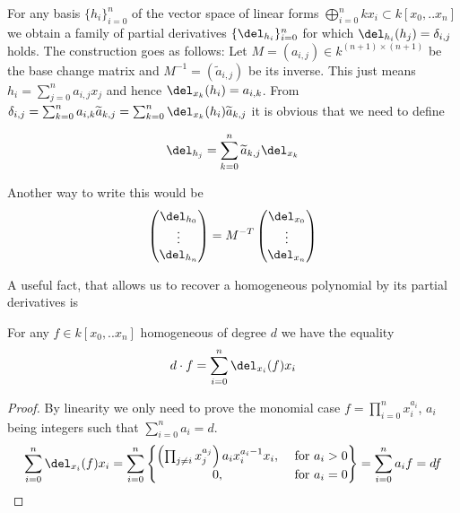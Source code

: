 \begin{example} \label{exampleAlternativePartialDerivatives}
For any basis $\{ h_i\}_{i=0}^n$ of the vector space of linear forms $\bigoplus_{i=0}^n kx_i \subset k[x_0,..x_n]$ we obtain a family of partial derivatives $\{ \del_{h_i} \}_{i=0}^n$ for which $\del_{h_i}(h_j) = \delta_{i,j}$ holds. The construction goes as follows: Let $M = (a_{i,j})  \in k^{(n+1)\times(n+1)}$ be the base change matrix and $M^{-1} = (\widetilde a_{i,j})$ be its inverse.
This just means $h_i = \sum_{j=0}^n a_{i,j} x_j$ and hence $\del_{x_k}(h_i) = a_{i,k}$.
From $\delta_{i,j} = \sum_{k=0}^n a_{i,k}\widetilde a_{k,j}
= \sum_{k=0}^n \del_{x_k}(h_i) \widetilde a_{k,j}$ it is obvious that we need to define

\begin{equation}
\del_{h_j} = \sum_{k=0}^n \widetilde a_{k,j} \del_{x_k}
\end{equation}

Another way to write this would be
\begin{equation}
\begin{pmatrix} \del_{h_0} \\ \vdots \\ \del_{h_n} \end{pmatrix}
= M^{-T}
\begin{pmatrix} \del_{x_0} \\ \vdots \\ \del_{x_n} \end{pmatrix}
\end{equation}
\end{example}

A useful fact, that allows us to recover a homogeneous polynomial by its partial derivatives is

\begin{proposition}
For any $f \in k[x_0,..x_n]$ homogeneous of degree $d$ we have the equality
\[ d\cdot f = \sum_{i=0}^n \del_{x_i}(f)x_i \]
\end{proposition}
\begin{proof}
By linearity we only need to prove the monomial case $f = \prod_{i=0}^n x_i^{a_i}$, $a_i$ being integers such that $\sum_{i=0}^n a_i = d$.
\begin{equation}
\sum_{i=0}^n \del_{x_i}(f)x_i
= \sum_{i=0}^n \begin{Bmatrix} \left(\prod_{j\neq i} x_j^{a_j}\right) a_i x_i^{a_i-1} x_i, & \text{ for } a_i > 0
\\ 0, &\text{ for } a_i = 0 \end{Bmatrix}
= \sum_{i=0}^n a_i f = df
\end{equation}
\end{proof}

